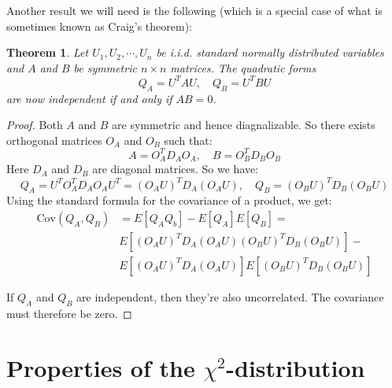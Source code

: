 \documentclass[12pt, a4paper]{article}
\newtheorem{theorem}{Theorem}
\begin{document}
Another result we will need is the following (which is a special case of what is sometimes known as Craig's theorem):
\begin{theorem}
\label{craig}
Let $U_1, U_2,\cdots,U_n$ be i.i.d. standard normally distributed variables and $A$ and $B$ be symmetric $n\times n$ matrices. The quadratic forms
\begin{equation}
Q_A=U^TAU,\quad Q_B=U^TBU
\end{equation}
are now independent if and only if $AB=0$.
\end{theorem}
\begin{proof}
Both $A$ and $B$ are symmetric and hence diagnalizable. So there exists orthogonal matrices $O_A$ and $O_B$ such that:
\begin{equation}
A=O_A^T D_A O_A,\quad B=O_B^T D_B O_B
\end{equation}
Here $D_A$ and $D_B$ are diagonal matrices. So we have:
\begin{equation}
Q_A=U^T O_A^T D_A O_A U^T = (O_A U)^T D_A (O_A U),\quad Q_B=(O_B U)^T D_B (O_B U)
\end{equation}
Using the standard formula for the covariance of a product, we get:
\begin{align*}
\textrm{Cov}(Q_A,Q_B) & =E[Q_AQ_b]-E[Q_A]E[Q_B]=\\
& E[(O_A U)^T D_A (O_A U)(O_B U)^T D_B (O_B U)]-\\
& E[(O_A U)^T D_A (O_A U)]E[(O_B U)^T D_B (O_B U)]
\end{align*}

If $Q_A$ and $Q_B$ are independent, then they're also uncorrelated. The covariance must therefore be zero. 
\end{proof}

\section{Properties of the $\chi^2$-distribution}
\end{document}
